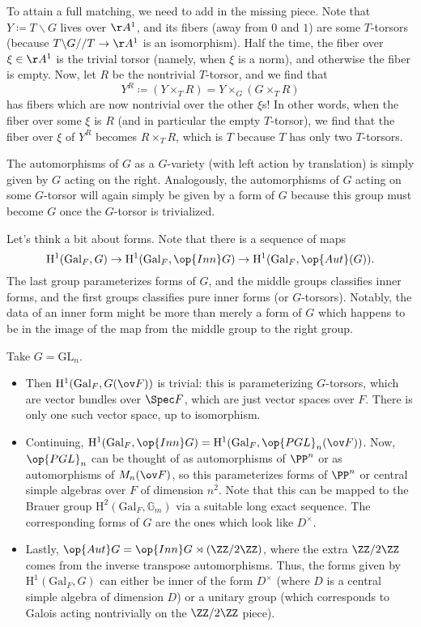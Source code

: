 \documentclass[../notes.tex]{subfiles}
\begin{document}
To attain a full matching, we need to add in the missing piece. Note that $Y\coloneqq T\backslash G$ lives over $\AA^1$, and its fibers (away from $0$ and $1$) are some $T$-torsors (because $T\backslash G//T\to\AA^1$ is an isomorphism). Half the time, the fiber over $\xi\in\AA^1$ is the trivial torsor (namely, when $\xi$ is a norm), and otherwise the fiber is empty. Now, let $R$ be the nontrivial $T$-torsor, and we find that
\[Y^R\coloneqq(Y\times_TR)=Y\times_G(G\times_TR)\]
has fibers which are now nontrivial over the other $\xi$s! In other words, when the fiber over some $\xi$ is $R$ (and in particular the empty $T$-torsor), we find that the fiber over $\xi$ of $Y^R$ becomes $R\times_TR$, which is $T$ because $T$ has only two $T$-torsors.
\begin{remark}
	The automorphisms of $G$ as a $G$-variety (with left action by translation) is simply given by $G$ acting on the right. Analogously, the automorphisms of $G$ acting on some $G$-torsor will again simply be given by a form of $G$ because this group must become $G$ once the $G$-torsor is trivialized.
\end{remark}
\begin{remark}
	Let's think a bit about forms. Note that there is a sequence of maps
	\[\mathrm H^1(\mathrm{Gal}_F,G)\to\mathrm H^1(\mathrm{Gal}_F,\op{Inn}G)\to\mathrm H^1(\mathrm{Gal}_F,\op{Aut}(G)).\]
	The last group parameterizes forms of $G$, and the middle groups classifies inner forms, and the first groups classifies pure inner forms (or $G$-torsors). Notably, the data of an inner form might be more than merely a form of $G$ which happens to be in the image of the map from the middle group to the right group.
\end{remark}
\begin{example}
	Take $G=\mathrm{GL}_n$.
	\begin{itemize}
		\item Then $\mathrm H^1(\mathrm{Gal}_F,G(\ov F))$ is trivial: this is parameterizing $G$-torsors, which are vector bundles over $\Spec F$, which are just vector spaces over $F$. There is only one such vector space, up to isomorphism.
		\item Continuing, $\mathrm H^1(\mathrm{Gal}_F,\op{Inn}G)=\mathrm H^1(\mathrm{Gal}_F,\op{PGL}_n(\ov F))$. Now, $\op{PGL}_n$ can be thought of as automorphisms of $\PP^n$ or as automorphisms of $M_n(\ov F)$, so this parameterizes forms of $\PP^n$ or central simple algebras over $F$ of dimension $n^2$. Note that this can be mapped to the Brauer group $\mathrm H^2(\mathrm{Gal}_F,\mathbb G_m)$ via a suitable long exact sequence. The corresponding forms of $G$ are the ones which look like $D^\times$.
		\item Lastly, $\op{Aut}G=\op{Inn}G\rtimes(\ZZ/2\ZZ)$, where the extra $\ZZ/2\ZZ$ comes from the inverse transpose automorphisms. Thus, the forms given by $\mathrm H^1(\mathrm{Gal}_F,G)$ can either be inner of the form $D^\times$ (where $D$ is a central simple algebra of dimension $D$) or a unitary group (which corresponds to Galois acting nontrivially on the $\ZZ/2\ZZ$ piece).
	\end{itemize}
\end{example}
\end{document}
